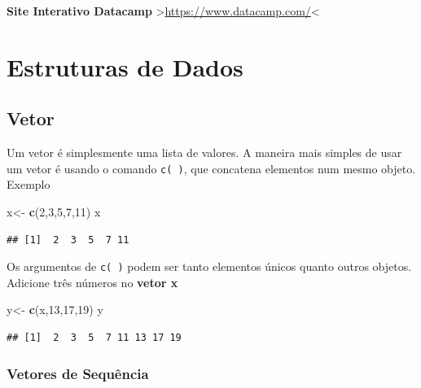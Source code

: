\documentclass[]{book}
\newenvironment{Shaded}{\begin{snugshade}}{\end{snugshade}}
\newcommand{\DecValTok}[1]{\textcolor[rgb]{0.00,0.00,0.81}{#1}}
\newcommand{\KeywordTok}[1]{\textcolor[rgb]{0.13,0.29,0.53}{\textbf{#1}}}
\newcommand{\NormalTok}[1]{#1}
\newcommand{\StringTok}[1]{\textcolor[rgb]{0.31,0.60,0.02}{#1}}
\begin{document}
\textbf{Site Interativo Datacamp} \textgreater{}\url{https://www.datacamp.com/}\textless{}

\hypertarget{estruturas-de-dados}{%
\chapter{Estruturas de Dados}\label{estruturas-de-dados}}

\hypertarget{vetor}{%
\section{Vetor}\label{vetor}}

Um vetor é simplesmente uma lista de valores.
A maneira mais simples de usar um vetor é usando o comando \texttt{c(\ )}, que concatena elementos num mesmo objeto.
Exemplo

\begin{Shaded}
\begin{Highlighting}[]
\NormalTok{x<-}\StringTok{ }\KeywordTok{c}\NormalTok{(}\DecValTok{2}\NormalTok{,}\DecValTok{3}\NormalTok{,}\DecValTok{5}\NormalTok{,}\DecValTok{7}\NormalTok{,}\DecValTok{11}\NormalTok{) }
\NormalTok{x}
\end{Highlighting}
\end{Shaded}

\begin{verbatim}
## [1]  2  3  5  7 11
\end{verbatim}

Os argumentos de \texttt{c(\ )} podem ser tanto elementos únicos quanto outros objetos. Adicione três números no \textbf{vetor x}

\begin{Shaded}
\begin{Highlighting}[]
\NormalTok{y<-}\StringTok{ }\KeywordTok{c}\NormalTok{(x,}\DecValTok{13}\NormalTok{,}\DecValTok{17}\NormalTok{,}\DecValTok{19}\NormalTok{)}
\NormalTok{y}
\end{Highlighting}
\end{Shaded}

\begin{verbatim}
## [1]  2  3  5  7 11 13 17 19
\end{verbatim}

\hypertarget{vetores-de-sequencia}{%
\subsection{Vetores de Sequência}\label{vetores-de-sequencia}}
\end{document}
